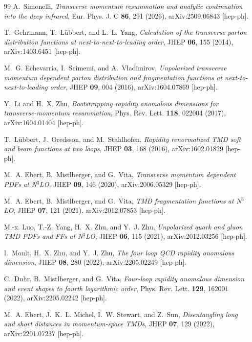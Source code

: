 \documentclass[11pt]{article}
\begin{document}
\begin{thebibliography}{99}
A.~Simonelli,
\textit{Transverse momentum resummation and analytic continuation into the deep infrared},
Eur. Phys. J. C \textbf{86}, 291 (2026),
arXiv:2509.06843 [hep-ph].


T.~Gehrmann, T.~L\"ubbert, and L.~L. Yang,
\textit{Calculation of the transverse parton distribution functions at next-to-next-to-leading order},
JHEP \textbf{06}, 155 (2014),
arXiv:1403.6451 [hep-ph].

M.~G. Echevarria, I.~Scimemi, and A.~Vladimirov,
\textit{Unpolarized transverse momentum dependent parton distribution and fragmentation functions at next-to-next-to-leading order},
JHEP \textbf{09}, 004 (2016),
arXiv:1604.07869 [hep-ph].

Y.~Li and H.~X. Zhu,
\textit{Bootstrapping rapidity anomalous dimensions for transverse-momentum resummation},
Phys. Rev. Lett. \textbf{118}, 022004 (2017),
arXiv:1604.01404 [hep-ph].

T.~L\"ubbert, J.~Oredsson, and M.~Stahlhofen,
\textit{Rapidity renormalized TMD soft and beam functions at two loops},
JHEP \textbf{03}, 168 (2016),
arXiv:1602.01829 [hep-ph].

M.~A. Ebert, B.~Mistlberger, and G.~Vita,
\textit{Transverse momentum dependent PDFs at N$^3$LO},
JHEP \textbf{09}, 146 (2020),
arXiv:2006.05329 [hep-ph].

M.~A. Ebert, B.~Mistlberger, and G.~Vita,
\textit{TMD fragmentation functions at N$^3$LO},
JHEP \textbf{07}, 121 (2021),
arXiv:2012.07853 [hep-ph].

M.-x. Luo, T.-Z. Yang, H.~X. Zhu, and Y.~J. Zhu,
\textit{Unpolarized quark and gluon TMD PDFs and FFs at N$^3$LO},
JHEP \textbf{06}, 115 (2021),
arXiv:2012.03256 [hep-ph].

I.~Moult, H.~X. Zhu, and Y.~J. Zhu,
\textit{The four loop QCD rapidity anomalous dimension},
JHEP \textbf{08}, 280 (2022),
arXiv:2205.02249 [hep-ph].

C.~Duhr, B.~Mistlberger, and G.~Vita,
\textit{Four-loop rapidity anomalous dimension and event shapes to fourth logarithmic order},
Phys. Rev. Lett. \textbf{129}, 162001 (2022),
arXiv:2205.02242 [hep-ph].

M.~A. Ebert, J.~K.~L. Michel, I.~W. Stewart, and Z.~Sun,
\textit{Disentangling long and short distances in momentum-space TMDs},
JHEP \textbf{07}, 129 (2022),
arXiv:2201.07237 [hep-ph].


\end{thebibliography}
\end{document}

